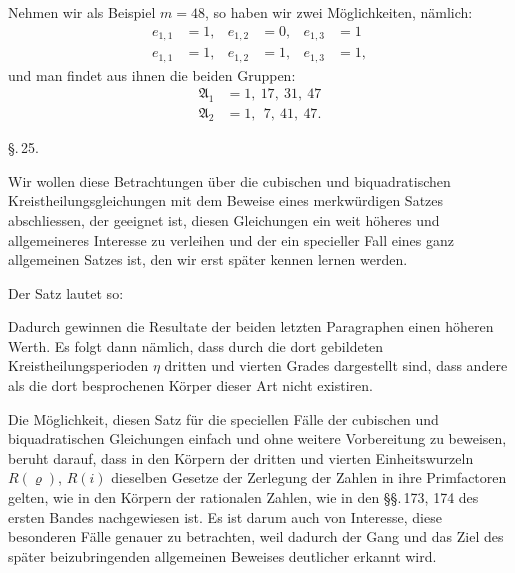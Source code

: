 Nehmen wir als Beispiel $m = 48$, so haben wir zwei Möglichkeiten, nämlich:
\[ \begin{aligned}
e_{1,1} &= 1, & e_{1,2} &= 0, & e_{1,3} &= 1\\
e_{1,1} &= 1, & e_{1,2} &= 1, & e_{1,3} &= 1,
\end{aligned} \]
und man findet aus ihnen die beiden Gruppen:
\[ \begin{aligned}
\mathfrak{A}_1 &= 1,\ 17,\ 31,\ 47\\
\mathfrak{A}_2 &= 1,\ \ 7,\ 41,\ 47.
\end{aligned} \]

\begin{center}
\S.\,25.
\end{center}

\begin{center}
\end{center}

Wir wollen diese Betrachtungen über die cubischen und
biquadratischen Kreistheilungsgleichungen mit dem Beweise eines
merkwürdigen Satzes abschliessen, der geeignet ist, diesen Gleichungen
 ein weit höheres und allgemeineres Interesse zu verleihen
 und der ein specieller Fall eines ganz allgemeinen Satzes
ist, den wir erst später kennen lernen werden.

Der Satz lautet so:


Dadurch gewinnen die Resultate der beiden letzten Paragraphen
 einen höheren Werth. Es folgt dann nämlich, dass
durch die dort gebildeten Kreistheilungsperioden $\eta$  dritten und vierten Grades dargestellt sind,
dass andere als die dort besprochenen Körper dieser Art nicht
existiren.

Die Möglichkeit, diesen Satz für die speciellen Fälle der
cubischen und biquadratischen Gleichungen einfach und ohne
weitere Vorbereitung zu beweisen, beruht darauf, dass in den
Körpern der dritten und vierten Einheitswurzeln $R(\varrho)$, $R(i)$ dieselben
 Gesetze der Zerlegung der Zahlen in ihre Primfactoren
gelten, wie in den Körpern der rationalen Zahlen, wie in den
\S\S.\,173, 174 des ersten Bandes nachgewiesen ist. Es ist darum
auch von Interesse, diese besonderen Fälle genauer zu betrachten,
weil dadurch der Gang und das Ziel des später beizubringenden
 allgemeinen Beweises deutlicher erkannt wird.
